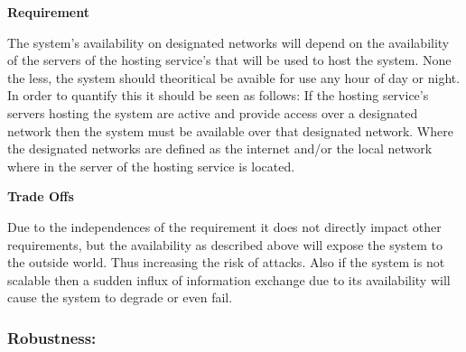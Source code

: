 \begin{flushleft}
\vspace{0.1in}

\textbf{Requirement}

The system's availability on designated networks will depend on the availability of the servers of the hosting service's that will be used to host the system. None the less, the system should theoritical be avaible for use any hour of day or night.\\
In order to quantify this it should be seen as follows: If the hosting service's servers hosting the system are active and provide access over a designated network then the system must be available over that designated network. Where the designated networks are defined as the internet and/or the local network where in the server of the hosting service is located.
\vspace{0.1in}

\textbf{Trade Offs}

Due to the independences of the requirement it does not directly impact other requirements, but the availability as described above will expose the system to the outside world. Thus increasing the risk of attacks. Also if the system is not scalable then a sudden influx of information exchange due to its availability will cause the system to degrade or even fail.  

\vspace{0.1in}
\end{flushleft}
\newpage
\subsubsection{Robustness:}

